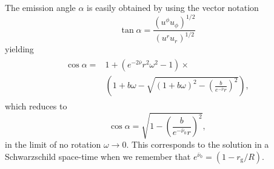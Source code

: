 \documentclass[iop, usenatbib]{emulateapj}
\newcommand{\be}{\begin{equation}}
\newcommand{\ee}{\end{equation}}
\newcommand{\rg}{\ensuremath{r_{\mathrm{g}}}}
\newcommand{\sch}{Schwarzschild }
\newcommand{\nub}{\ensuremath{\bar{\nu}}}
\begin{document}
The emission angle $\alpha$ is easily obtained by using the vector notation
\be
\tan \alpha = \frac{(u^{\phi}u_{\phi})^{1/2}}{(u^ru_r)^{1/2}}
\ee
yielding
\begin{align}\begin{split}
\cos \alpha = & 1 + (e^{-2\nub}r^2\omega^2 -1) \times \\
            & \left( 1+b\omega - \sqrt{(1+b\omega)^2 - \left(\frac{b}{e^{-\nub}r}\right)^2} \right),
\end{split}\end{align}
which reduces to
\be
\cos \alpha = \sqrt{1-\left( \frac{b}{e^{-\nub_0}r} \right)^2},
\ee
in the limit of no rotation $\omega \rightarrow 0$. This corresponds to
the solution in a \sch space-time when we remember that $e^{\nub_0} = (1-\rg/R)$.
\end{document}
